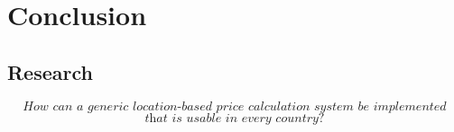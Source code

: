 \graphicspath{{Chapter7/Figs/Vector/}{Chapter7/Figs/}}

%
\chapter{Conclusion}
\section{Research}
\[\textit{How can a generic location-based price calculation system be implemented}\]
\[\textit{that is usable in every country?}\] \hfill

